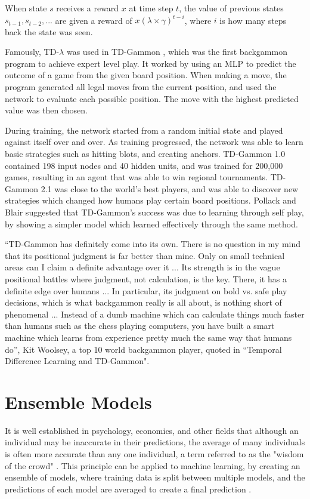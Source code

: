 When state $s$ receives a reward $x$ at time step $t$, the value of previous states $s_{t-1}, s_{t-2}, ...$ are given a reward of $x (\lambda \times \gamma)^{t - i}$, where $i$ is how many steps back the state was seen.

Famously, TD-$\lambda$ was used in TD-Gammon \cite{Tesauro1995}, which was the first backgammon program to achieve expert level play.
It worked by using an MLP to predict the outcome of a game from the given board position. 
When making a move, the program generated all legal moves from the current position, and used the network to evaluate each possible position.
The move with the highest predicted value was then chosen.

During training, the network started from a random initial state and played against itself over and over. 
As training progressed, the network was able to learn basic strategies such as hitting blots, and creating anchors.
TD-Gammon 1.0 contained 198 input nodes and 40 hidden units, and was trained for 200,000 games, resulting in an agent that was able to win regional tournaments.
TD-Gammon 2.1 was close to the world's best players, and was able to discover new strategies which changed how humans play certain board positions.
Pollack and Blair \cite{Pollack1997} suggested that TD-Gammon's success was due to learning through self play, by showing a simpler model which learned effectively through the same method. 



“TD-Gammon has definitely come into its own. There is no question in my mind that its positional judgment is far better than mine.
Only on small technical areas can I claim a definite advantage over it ... Its strength is in the vague positional battles where judgment, not calculation,
is the key. There, it has a definite edge over humans ... In particular, its judgment on bold vs. safe play decisions, which is what backgammon really is all about, is nothing short of phenomenal ...
Instead of a dumb machine which can calculate things much faster than humans such as the chess playing computers, you have built a smart machine which learns from experience pretty much the
same way that humans do”, Kit Woolsey, a top 10 world backgammon player, quoted in ``Temporal Difference Learning and TD-Gammon"\cite{Tesauro1995}.

\section{Ensemble Models}
It is well established in psychology, economics, and other fields that although an individual may be inaccurate in their predictions, the average of many individuals is often more accurate than any one individual, a term referred to as the "wisdom of the crowd" \cite{wisdomjames} \cite{wisdom2}.
This principle can be applied to machine learning, by creating an ensemble of models, where training data is split between multiple models, and the predictions of each model are averaged to create a final prediction \cite{Brown_EnsembleLearning_2011}. 
